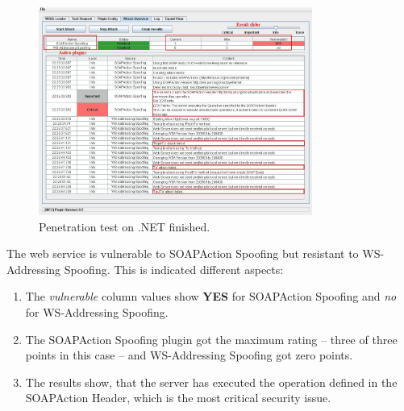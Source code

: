 \begin{figure}[h!]
    \begin{center}
        \includegraphics[width=0.8\textwidth]{img/attack_done}
    \end{center}
    \caption{Penetration test on .NET finished.}
    \label{fig:attack_done}
\end{figure}

The web service is vulnerable to SOAPAction Spoofing but resistant to
WS-Addressing Spoofing. This is indicated different aspects:

\begin{enumerate}
    \item The \emph{vulnerable} column values show \textbf{YES} for SOAPAction Spoofing and \emph{no} for WS-Addressing Spoofing.
    \item The SOAPAction Spoofing plugin got the maximum rating -- three of three points in this case -- and WS-Addressing Spoofing got zero points.
    \item The results show, that the server has executed the operation defined
        in the SOAPAction Header, which is the most critical security issue.
\end{enumerate}

